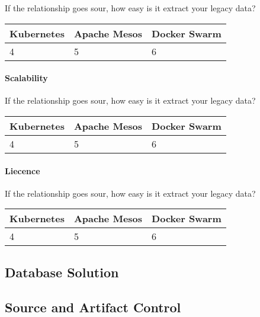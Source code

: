 If the relationship goes sour, how easy is it extract your legacy data?

\begin{center}
  \begin{tabular}{ | p{4.2cm} | p{4.2cm} | p{4.2cm} | }
    \hline
    \textbf{Kubernetes}&\textbf{Apache Mesos}&\textbf{Docker Swarm}\\\hline
    4 & 5 & 6 \\
    \hline
  \end{tabular}
\end{center}

\paragraph{Scalability}

If the relationship goes sour, how easy is it extract your legacy data?

\begin{center}
  \begin{tabular}{ | p{4.2cm} | p{4.2cm} | p{4.2cm} | }
    \hline
    \textbf{Kubernetes}&\textbf{Apache Mesos}&\textbf{Docker Swarm}\\\hline
    4 & 5 & 6 \\
    \hline
  \end{tabular}
\end{center}

\paragraph{Liecence}

If the relationship goes sour, how easy is it extract your legacy data?

\begin{center}
  \begin{tabular}{ | p{4.2cm} | p{4.2cm} | p{4.2cm} | }
    \hline
    \textbf{Kubernetes}&\textbf{Apache Mesos}&\textbf{Docker Swarm}\\\hline
    4 & 5 & 6 \\
    \hline
  \end{tabular}
\end{center}
 
\subsection{Database Solution}
\subsection{Source and Artifact Control}
